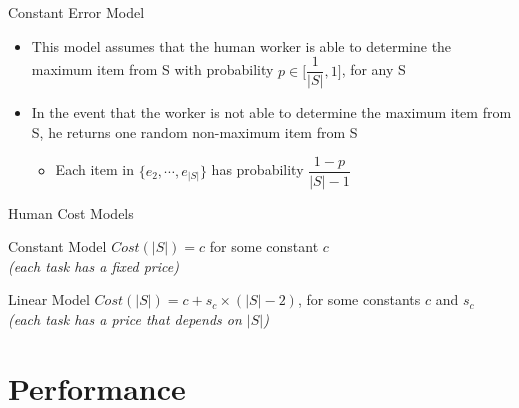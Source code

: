 \documentclass{beamer}
\begin{document}
\begin{frame}{Constant Error Model}
	\begin{itemize}
	\item This model assumes that the human worker is able to determine the maximum item from S with probability $p \in \Bigg[\dfrac{1}{\left\vert{S}\right\vert},1\Bigg]$, for any S
	\pause\vspace{8pt}
	\item In the event that the worker is not able to determine the maximum item from S, he returns one random non-maximum item from S
		\begin{itemize}
			\item Each item in $\{e_2, \cdots, e_{\left\vert{S}\right\vert}\}$ has probability $\dfrac{1-p}{\left\vert{S}\right\vert - 1}$
		\end{itemize}
	\end{itemize}
\end{frame}


\begin{frame}{Human Cost Models}
	\begin{block}{Constant Model}
		$Cost(\left\vert{S}\right\vert) = c$ for some constant $c$\\\textit{(each task has a fixed price)}
	\end{block}
	
	\pause
	\begin{block}{Linear Model}
		$Cost(\left\vert{S}\right\vert) = c+s_c ×(\left\vert{S}\right\vert−2)$, for some constants $c$ and $s_c$\\\textit{(each task has a price that depends on $\left\vert{S}\right\vert$)}
	\end{block}
\end{frame}


\section{Performance}
\begin{frame}
\end{frame}
\end{document}
